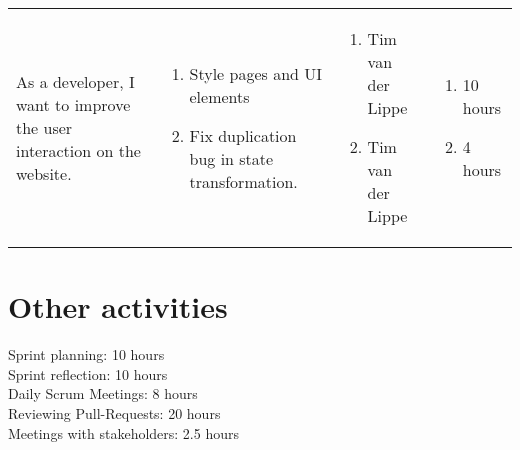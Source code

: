 \documentclass[11pt,a4paper]{article}
\begin{document}
\begin{table}[h]
\begin{tabular}{|p{4.5cm}|p{7cm}|p{4cm}|p{2.6cm}|}
As a developer, I want to improve the user interaction on the website.
&
\begin{enumerate}
\item Style pages and UI elements
\item Fix duplication bug in state transformation.
\end{enumerate}

& 
\begin{enumerate}
\item Tim van der Lippe
\item Tim van der Lippe
\end{enumerate}

& 
\begin{enumerate}
\item 10 hours
\item 4 hours
\end{enumerate}
\\
          
\end{tabular}
\end{table}
\newpage

\section*{Other activities}
Sprint planning: 10 hours\\
Sprint reflection: 10 hours\\
Daily Scrum Meetings: 8 hours\\
Reviewing Pull-Requests: 20 hours\\
Meetings with stakeholders: 2.5 hours\\
\end{document}
